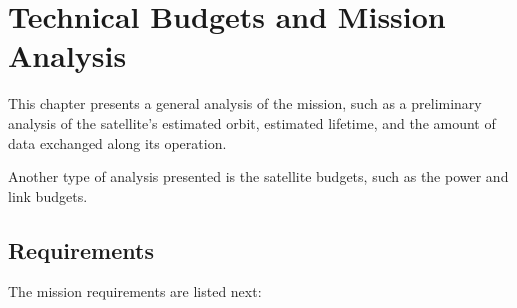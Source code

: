 %
%
%
%
%

%
%
%
%
%
%

\chapter{Technical Budgets and Mission Analysis} \label{ch:budgets}

This chapter presents a general analysis of the mission, such as a preliminary analysis of the satellite's estimated orbit, estimated lifetime, and the amount of data exchanged along its operation.

Another type of analysis presented is the satellite budgets, such as the power and link budgets.

\section{Requirements}

The mission requirements are listed next:

